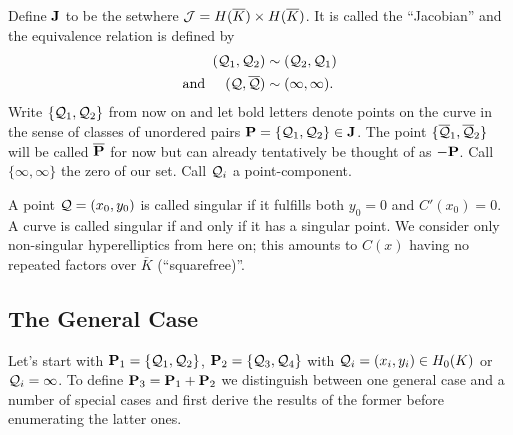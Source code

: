 \documentclass[english,11pt,a4paper]{article}
\begin{document}
\begin{defin}\label{defj}
	Define $\J$ to be the set\scalebox{1.3}{ $\nicefrac{ \j }{\sim }$ }where $\j = \ekb \times \ekb$. It is called the ``Jacobian'' and the equivalence relation is defined by
	\begin{align*}
		(\q_1,\q_2) &\sim (\q_2,\q_1) \\
		\text{and\hspace{5mm}} (\q,\bar \q) & \sim ( \infty , \infty ). 
	\end{align*}
	Write $\{ \q_1,\q_2 \}$ from now on and let bold letters denote points on the curve in the sense of classes of unordered pairs $\P =\{ \q_1, \q_2 \} \in \J$. The point $\{ \bar \q_1, \bar \q_2 \}$ will be called $\bar \P$ for now but can already tentatively be thought of as $-\P$. Call $\{ \infty, \infty \}$ the zero of our set. Call $\q_i$ a point-component.%

	A point $\q = (x_0,y_0)$ is called singular if it fulfills both $y_0=0$ and $C'(x_0) = 0$. A curve is called singular if and only if it has a singular point. We consider only non-singular hyperelliptics from here on; this amounts to $C(x)$ having no repeated factors over $\bar K$ (``squarefree)''.%
\end{defin}

\subsection{The General Case}

Let's start with $\P_1 = \{\q_1,\q_2\}$, $\P_2 = \{\q_3,\q_4\}$ with $\q_i = (x_i,y_i) \in \enk$ or $\q_i = \infty$. To define $\P_3 = \P_1 + \P_2$ we distinguish between one general case and a number of special cases and first derive the results of the former before enumerating the latter ones.
\end{document}
